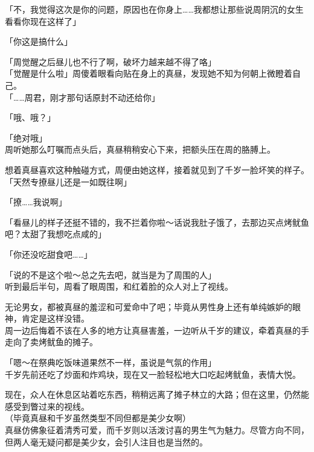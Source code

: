 「不，我觉得这次是你的问题，原因也在你身上……我都想让那些说周阴沉的女生看看你现在这样了」

「你这是搞什么」

「周觉醒之后昼儿也不行了啊，破坏力越来越不得了咯」\\

「觉醒是什么啦」周傻着眼看向贴在身上的真昼，发现她不知为何朝上微瞪着自己。\\

「……周君，刚才那句话原封不动还给你」

「哦、哦？」

「绝对哦」\\

周听她那么叮嘱而点头后，真昼稍稍安心下来，把额头压在周的胳膊上。

想着真昼喜欢这种触碰方式，周便由她这样，接着就见到了千岁一脸坏笑的样子。\\

「天然专撩昼儿还是一如既往啊」

「撩……我说啊」

「看昼儿的样子还挺不错的，我不拦着你啦～话说我肚子饿了，去那边买点烤鱿鱼吧？太甜了我想吃点咸的」

「你还没吃甜食吧……」

「说的不是这个啦～总之先去吧，就当是为了周围的人」\\

听到最后半句，周看了眼周围，和红着脸的众人对上了视线。

无论男女，都被真昼的羞涩和可爱命中了吧；毕竟从男性身上还有单纯嫉妒的眼神，肯定是这样没错。\\

周一边后悔着不该在人多的地方让真昼害羞，一边听从千岁的建议，牵着真昼的手走向了卖烤鱿鱼的摊子。\\

\vspace{2\baselineskip}

「嗯～在祭典吃饭味道果然不一样，虽说是气氛的作用」\\

千岁先前还吃了炒面和炸鸡块，现在又一脸轻松地大口吃起烤鱿鱼，表情大悦。

现在，众人在休息区站着吃东西，稍稍远离了摊子林立的大路；但在这里，仍然能感受到瞥过来的视线。\\

（毕竟真昼和千岁虽然类型不同但都是美少女啊）\\

真昼仿佛象征着清秀可爱，而千岁则以活泼讨喜的男生气为魅力。尽管方向不同，但两人毫无疑问都是美少女，会引人注目也是当然的。


